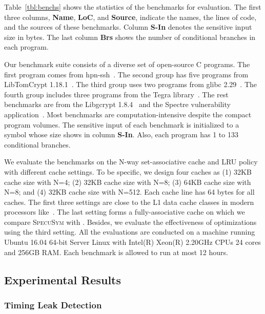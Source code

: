 \documentclass[sigconf]{acmart}
\newcommand{\SpecuSym}{\textsc{SpecuSym} }
\begin{document}
Table~\ref{tbl:benchs} shows the statistics of the benchmarks for evaluation.  
The first three columns, \textbf{Name}, \textbf{LoC}, and \textbf{Source}, 
indicate the names, the lines of code, and the sources of these benchmarks. 
Column \textbf{S-In} denotes the sensitive input size in bytes. The last 
column \textbf{Brs} shows the number of conditional branches in each program.


Our benchmark suite consists of a diverse set of open-source C programs. 
The first program comes from hpn-ssh~\cite{hpn-ssh}. The second group has 
five programs from LibTomCrypt 1.18.1~\cite{LibTomCrypt}. The third group 
uses two programs from glibc 2.29~\cite{glibc}. The fourth group includes 
three programs from the Tegra library~\cite{Tegra}. The rest benchmarks 
are from the Libgcrypt 1.8.4~\cite{Libgcrypt} and the Spectre vulnerability
application~\cite{spectre-attack}. Most benchmarks are computation-intensive 
despite the compact program volumes. The sensitive input of each benchmark 
is initialized to a symbol whose size shows in column \textbf{S-In}. Also, 
each program has 1 to 133 conditional branches.


We evaluate the benchmarks on the N-way set-associative cache and LRU 
policy with different cache settings. To be specific, we design four 
caches as (1) 32KB cache size with N=4; (2) 32KB cache size with N=8; (3) 
64KB cache size with N=8; and (4) 32KB cache size with N=512. Each cache 
line has 64 bytes for all caches. The first three settings are close to 
the L1 data cache classes in modern processors like~\cite{Skylake,Kabylake}. 
The last setting forms a fully-associative cache on which we compare 
\SpecuSym with \cite{WuW19}. Besides, we evaluate the effectiveness of 
optimizations using the third setting. All the evaluations are conducted 
on a machine running Ubuntu 16.04 64-bit Server Linux with Intel(R) Xeon(R) 
2.20GHz CPUs 24 cores and 256GB RAM. Each benchmark is allowed to run at 
most 12 hours.


\subsection{Experimental Results}
\label{sec:experiments}

\subsubsection{Timing Leak Detection}
\label{sec:leak_detect}
\end{document}
